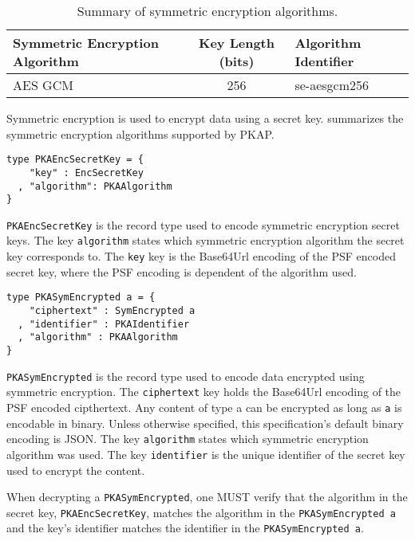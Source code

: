 \documentclass{article}
\newcommand{\pkap}{PKAP}
\begin{document}
\begin{table}
\begin{center}
\begin{tabular}{| l | c | l |}
\hline
Symmetric Encryption Algorithm & Key Length (bits) & Algorithm Identifier \\ 
\hline
AES GCM & 256 & se-aesgcm256 \\
\hline
\end{tabular}
\end{center}
\caption{Summary of symmetric encryption algorithms.}
\label{table:symmetric_enc_alg}
\end{table}

Symmetric encryption is used to encrypt data using a secret key.  summarizes the symmetric encryption algorithms supported by \pkap{}. 

\begin{lstlisting}
type PKAEncSecretKey = {
    "key" : EncSecretKey
  , "algorithm": PKAAlgorithm
}
\end{lstlisting}

\texttt{PKAEncSecretKey} is the record type used to encode symmetric encryption secret keys. The key \texttt{algorithm} states which symmetric encryption algorithm the secret key corresponds to. The \texttt{key} key is the Base64Url encoding of the PSF encoded secret key, where the PSF encoding is dependent of the algorithm used. 

\begin{lstlisting}
type PKASymEncrypted a = {
    "ciphertext" : SymEncrypted a
  , "identifier" : PKAIdentifier
  , "algorithm" : PKAAlgorithm
}
\end{lstlisting}

\label{type-PKASymEncrypted}
\texttt{PKASymEncrypted} is the record type used to encode data encrypted using symmetric encryption. The \texttt{ciphertext} key holds the Base64Url encoding of the PSF encoded cipthertext. Any content of type a can be encrypted as long as \texttt{a} is encodable in binary. Unless otherwise specified, this specification's default binary encoding is JSON. The key \texttt{algorithm} states which symmetric encryption algorithm was used. The key \texttt{identifier} is the unique identifier of the secret key used to encrypt the content. 

When decrypting a \texttt{PKASymEncrypted}, one MUST verify that the algorithm in the secret key, \texttt{PKAEncSecretKey}, matches the algorithm in the \texttt{PKASymEncrypted a} and the key's identifier matches the identifier in the \texttt{PKASymEncrypted a}. 
\end{document}
